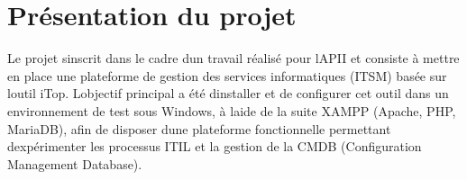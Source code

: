 \chapter{Présentation du projet}

Le projet s\textquotesingle inscrit dans le cadre d\textquotesingle un travail réalisé pour l\textquotesingle APII et consiste à mettre en place une plateforme de gestion des services informatiques (ITSM) basée sur l\textquotesingle outil iTop. L\textquotesingle objectif principal a été d\textquotesingle installer et de configurer cet outil dans un environnement de test sous Windows, à l\textquotesingle aide de la suite XAMPP (Apache, PHP, MariaDB), afin de disposer d\textquotesingle une plateforme fonctionnelle permettant d\textquotesingle expérimenter les processus ITIL et la gestion de la CMDB (Configuration Management Database).


